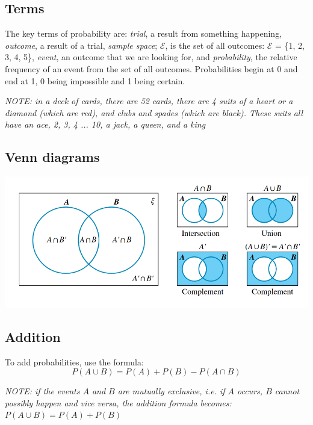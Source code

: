 \documentclass[a4paper,10pt]{report}
\begin{document}
\subsection{Terms}
The key terms of probability are: \emph{trial}, a result from something happening, \emph{outcome}, a result of a trial, \emph{sample space}; $\mathcal{E}$, is the set of all outcomes: $\mathcal{E}$ = \{1, 2, 3, 4, 5\}, \emph{event}, an outcome that we are looking for, and \emph{probability}, the relative frequency of an event from the set of all outcomes.  Probabilities begin at 0 and end at 1, 0 being impossible and 1 being certain.

\begin{center}
	\emph{NOTE: in a deck of cards, there are 52 cards, there are 4 suits of a heart or a diamond (which are red), and clubs and spades (which are black).  These suits all have an ace, 2, 3, 4 ... 10, a jack, a queen, and a king}
\end{center}

\subsection{Venn diagrams}
\begin{center}
	\includegraphics[scale=0.5]{venn diagrams}
\end{center}

\subsection{Addition}
To add probabilities, use the formula:
$$
	P(A \cup B) = P(A) + P(B) - P(A \cap B)
$$

\begin{center}
	\emph{NOTE: if the events $A$ and $B$ are mutually exclusive, i.e. if $A$ occurs, $B$ cannot possibly happen and vice versa, the addition formula becomes: $P(A \cup B) = P(A) + P(B)$}
\end{center}
\end{document}
